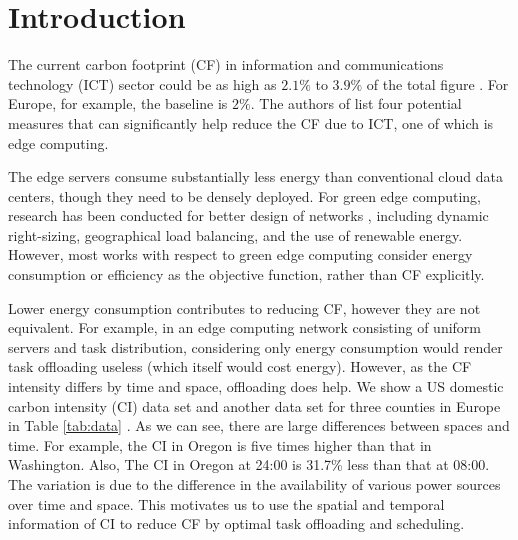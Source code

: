 \documentclass[conference, 10pt, ﬁnal, letterpaper, twocolumn]{IEEEtran}
\begin{document}
\section{Introduction}
The current carbon footprint (CF) in information and communications technology (ICT) sector could be as high as $2.1\%$ to $3.9\%$ of the total figure \cite{https://doi.org/10.48550/arxiv.2102.02622}. For Europe, for example, the baseline is $2\%$\cite{EuropeanCommission}. The authors of \cite{perrons2021digital} list four potential measures that can significantly help reduce the CF due to ICT, one of which is edge computing. 

The edge servers consume substantially less energy than conventional cloud data centers, though they need to be densely deployed. For green edge computing, research has been conducted for better design of networks \cite{mao2017survey}, including dynamic right-sizing, geographical load balancing, and the use of renewable energy. However, most works with respect to green edge computing consider energy consumption or efficiency as the objective function, rather than CF explicitly. 

Lower energy consumption contributes to reducing CF, however they are not equivalent. For example, in an edge computing network consisting of uniform servers and task distribution, considering only energy consumption would render task offloading useless (which itself would cost energy). However, as the CF intensity differs by time and space, offloading does help. We show a US domestic carbon intensity (CI) data set and another data set for three counties in Europe in Table \ref{tab:data} \cite{ElectricityMaps}. As we can see, there are large differences between spaces and time. For example, the CI in Oregon is five times higher than that in Washington. Also, The CI in Oregon at 24:00 is 31.7\% less than that at 08:00. The variation is due to the difference in the availability of various power sources over time and space. This motivates us to use the spatial and temporal information of CI to reduce CF by optimal task offloading and scheduling.  
\end{document}
